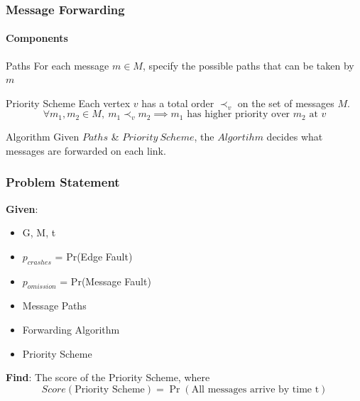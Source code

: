 \documentclass{beamer}
\begin{document}
\begin{frame}
\frametitle{Message Forwarding}
	\framesubtitle{Components}
	\begin{block}{Paths}
	For each message $ m\in M $, specify the possible paths that can be taken by $ m $
	\end{block}

	\begin{block}{Priority Scheme}
	Each vertex $ v $ has a total order $ \prec _{v} $ on the set of
	messages $ M $. $$\forall m_1,m_2 \in M,\ m_1\prec _{v}m_2 \implies m_1 \text{ has higher priority over } m_2 \text{ at } v$$
	\end{block}

	\begin{block}{Algorithm}
	Given $Paths$ \& $Priority\ Scheme$, the $Algortihm$ decides what messages are forwarded on each link.
	\end{block}
\end{frame}

\begin{frame}
\frametitle{Problem Statement}
	\textbf{Given}:
	\begin{itemize}
		\item G, M, t
		\item $p_{crashes}$ = Pr(Edge Fault)
		\item $p_{omission}$ = Pr(Message Fault)
		\item Message Paths
		\item Forwarding Algorithm
		\item Priority Scheme\\[3ex]
	\end{itemize}
	\textbf{Find}:
	The score of the Priority Scheme, where\\
		$$Score(\text{Priority Scheme}) = \Pr(\text{All messages arrive by time t})$$
\end{frame}
\end{document}
